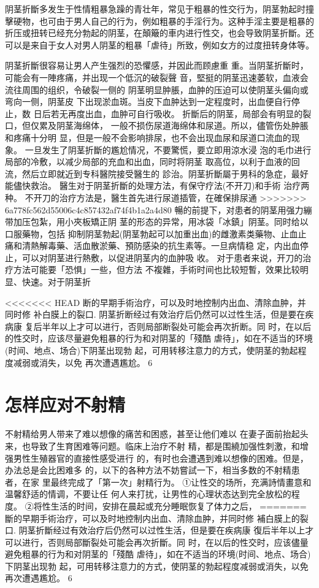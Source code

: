 \documentclass[12pt,UTF8]{ctexbook}
\begin{document}
阴茎折斷多发生于性情粗暴急躁的青壮年，常见于粗暴的性交行为，阴茎勃起时撞擊硬物，也可由于男人自己的行为，例如粗暴的手淫行为。这种手淫主要是粗暴的折压或扭转已经充分勃起的阴茎，在顛簸的車内进行性交，也会导致阴茎折斷。还可以是来自于女人对男人阴茎的粗暴「虐待」所致，例如女方的过度扭转身体等。

阴茎折斷很容易让男人产生强烈的恐懼感，并因此而顾慮重
重。当阴茎折斷时，可能会有一陣疼痛，并出现一个低沉的破裂聲
音，堅挺的阴茎迅速萎软，血液会流往周围的组织，令破裂一侧的
阴茎明显肿脹，血肿的压迫可以使阴茎头偏向或弯向一侧，阴茎皮
下出现淤血斑。当皮下血肿达到一定程度时，出血便自行停止，数
日后若无再度出血，血肿可自行吸收。
折斷后的阴茎，局部会有明显的裂口，但仅累及阴茎海绵体，
一般不损伤尿道海绵体和尿道。所以，儘管伤处肿脹和疼痛十分明
显，但是一般不会影响排尿，也不会出现血尿和尿道口流血的现
象。
一旦发生了阴茎折斷的尷尬情况，不要驚慌，要立即用涼水浸
泡的毛巾进行局部的冷敷，以减少局部的充血和出血，同时将阴茎
取高位，以利于血液的回流，然后立即就近到专科醫院接受醫生的
診治。阴茎折斷屬于男科的急症，最好能儘快救治。
醫生对于阴茎折斷的处理方法，有保守疗法(不开刀)和手術
治疗两种。
不开刀的治疗方法是，醫生首先进行尿道插管，在確保排尿通
>>>>>>> 6a778fc562d55006c4c857432af74f4b1a2a4d80
暢的前提下，对患者的阴茎用强力繃带加压包紮，用小夾板矯正阴
茎的形态的异常，用冰袋「冰鎮」阴茎。同时给以口服藥物，包括
抑制阴茎勃起(阴茎勃起可以加重出血)的雌激素类藥物、止血止
痛和清熱解毒藥、活血散淤藥、預防感染的抗生素等。一旦病情稳
定，内出血停止，可以对阴茎进行熱敷，以促进阴茎内的血肿吸
收。
对于患者来说，开刀的治疗方法可能要「恐惧」一些，但方法
不複雜，手術时间也比较短暫，效果比较明显、快速。对于阴茎折

<<<<<<< HEAD
断的早期手術治疗，可以及时地控制内出血、清除血肿，并同时修
补白膜上的裂口.
阴茎折断经过有效治疗后仍然可以过性生活，但是要在疾病康
复后半年以上才可以进行，否则局部断裂处可能会再次折断。同
时，在以后的性交时，应该尽量避免粗暴的行为和对阴茎的「殘酷
虐待」，如在不适当的环境(时间、地点、场合)下阴茎出现勃
起，可用转移注意力的方式，使阴茎的勃起程度减弱或消失，以免
再次遭遇尷尬。
6
\section{怎样应对不射精}
不射精给男人带来了难以想像的痛苦和困惑，甚至让他们难以
在妻子面前抬起头来，也导致了生育困难等问题。临床上治疗不射
精，都是围繞加强性刺激，和增强男性生殖器官的直接性感受进行
的，有时也会遭遇到难以想像的困难。但是，办法总是会比困难多
的，以下的各种方法不妨嘗試一下，相当多数的不射精患者，在家
里最终完成了「第一次」射精行为。
①让性交的场所，充满詩情畫意和温馨舒适的情调，不要让任
何人来打扰，让男性的心理状态达到完全放松的程度。
②将性生活的时间，安排在晨起或充分睡眠恢复了体力之后，
=======
斷的早期手術治疗，可以及时地控制内出血、清除血肿，并同时修
補白膜上的裂口.
阴茎折斷经过有效治疗后仍然可以过性生活，但是要在疾病康
復后半年以上才可以进行，否则局部斷裂处可能会再次折斷。同
时，在以后的性交时，应该儘量避免粗暴的行为和对阴茎的「殘酷
虐待」，如在不适当的环境(时间、地点、场合)下阴茎出现勃
起，可用转移注意力的方式，使阴茎的勃起程度减弱或消失，以免
再次遭遇尷尬。
6
\end{document}
